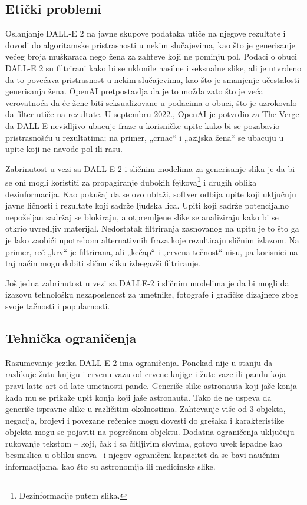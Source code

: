 \documentclass[a4paper]{article}
\begin{document}
\subsection{Etički problemi}
\label{subsec: Etički problemi}
Oslanjanje DALL-E 2 na javne skupove podataka utiče na njegove rezultate i dovodi do algoritamske pristrasnosti u nekim slučajevima, kao što je generisanje većeg broja muškaraca nego žena za zahteve koji ne pominju pol. Podaci o obuci DALL-E 2 su filtrirani kako bi se uklonile nasilne i seksualne slike, ali je utvrđeno da to povećava pristrasnost u nekim slučajevima, kao što je smanjenje učestalosti generisanja žena. OpenAI pretpostavlja da je to možda zato što je veća verovatnoća da će žene biti seksualizovane u podacima o obuci, što je uzrokovalo da filter utiče na rezultate. U septembru 2022., OpenAI je potvrdio za The Verge da DALL-E nevidljivo ubacuje fraze u korisničke upite kako bi se pozabavio pristrasnošću u rezultatima; na primer, „crnac“ i „azijska žena“ se ubacuju u upite koji ne navode pol ili rasu.

Zabrinutost u vezi sa DALL-E 2 i sličnim modelima za generisanje slika je da bi se oni mogli koristiti za propagiranje dubokih fejkova\footnote{Dezinformacije putem slika.} i drugih oblika dezinformacija. Kao pokušaj da se ovo ublaži, softver odbija upite koji uključuju javne ličnosti i rezultate koji sadrže ljudska lica. Upiti koji sadrže potencijalno nepoželjan sadržaj se blokiraju, a otpremljene slike se analiziraju kako bi se otkrio uvredljiv materijal. Nedostatak filtriranja zasnovanog na upitu je to što ga je lako zaobići upotrebom alternativnih fraza  koje rezultiraju sličnim izlazom. Na primer, reč „krv“ je filtrirana, ali „kečap“ i „crvena tečnost“ nisu, pa korisnici na taj način mogu dobiti sličnu sliku izbegavši filtriranje\cite{4}.

Još jedna zabrinutost u vezi sa DALLE-2 i sličnim modelima je da bi mogli da izazovu tehnološku  nezaposlenost za umetnike, fotografe i grafičke dizajnere zbog svoje tačnosti i popularnosti.
\subsection{Tehnička ograničenja}
\label{subsec: Tehnička ograničenja}
Razumevanje jezika DALL-E 2 ima ograničenja. Ponekad nije u stanju da razlikuje žutu knjigu i crvenu vazu od crvene knjige i žute vaze ili pandu koja pravi latte art od late umetnosti pande. Generiše slike astronauta koji jaše konja kada mu se prikaže upit konja koji jaše astronauta. Tako de ne uspeva da generiše ispravne slike u različitim okolnostima. Zahtevanje više od 3 objekta, negacija, brojevi i povezane rečenice mogu dovesti do grešaka i karakteristike objekta mogu se pojaviti na pogrešnom objektu. Dodatna ograničenja uključuju rukovanje tekstom – koji, čak i sa čitljivim slovima, gotovo uvek ispadne kao besmislica u obliku snova– i njegov ograničeni kapacitet da se bavi naučnim informacijama, kao što su astronomija ili medicinske slike\cite{5}.
\newpage
\end{document}
